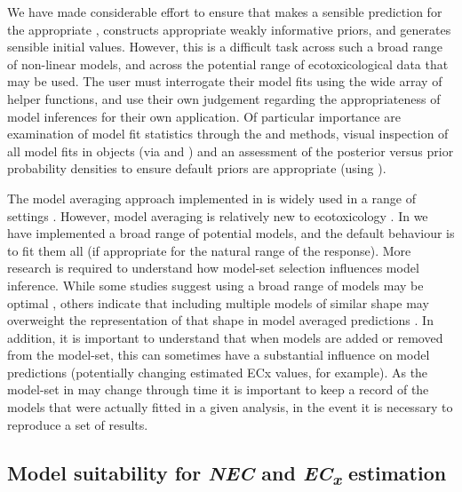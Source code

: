 \documentclass[
  shortnames]{jss}
\begin{document}
We have made considerable effort to ensure that  makes a sensible prediction for the appropriate , constructs appropriate weakly informative priors, and generates sensible initial values. However, this is a difficult task across such a broad range of non-linear models, and across the potential range of ecotoxicological data that may be used. The user must interrogate their model fits using the wide array of helper functions, and use their own judgement regarding the appropriateness of model inferences for their own application. Of particular importance are examination of model fit statistics through the  and  methods, visual inspection of all model fits in  objects (via  and ) and an assessment of the posterior versus prior probability densities to ensure default priors are appropriate (using ).

The model averaging approach implemented in  is widely used in a range of settings \citep[in ecology for example, see][ for a thorough review]{Dormann2018}. However, model averaging is relatively new to ecotoxicology \citep[but see, for example,][]{Shao2014, Thorley2018, fox2020, Wheeler2009}. In  we have implemented a broad range of potential models, and the default behaviour is to fit them all (if appropriate for the natural range of the response). More research is required to understand how model-set selection influences model inference. While some studies suggest using a broad range of models may be optimal \citep{Wheeler2009}, others indicate that including multiple models of similar shape may overweight the representation of that shape in model averaged predictions \citep{fox2020}. In addition, it is important to understand that when models are added or removed from the model-set, this can sometimes have a substantial influence on model predictions (potentially changing estimated ECx values, for example). As the model-set in  may change through time it is important to keep a record of the models that were actually fitted in a given analysis, in the event it is necessary to reproduce a set of results.

\subsection[Model suitability for NEC and ECx estimation]{Model suitability for \textit{NEC} and \textit{EC\textsubscript{x}} estimation}\label{modsuit}
\end{document}
